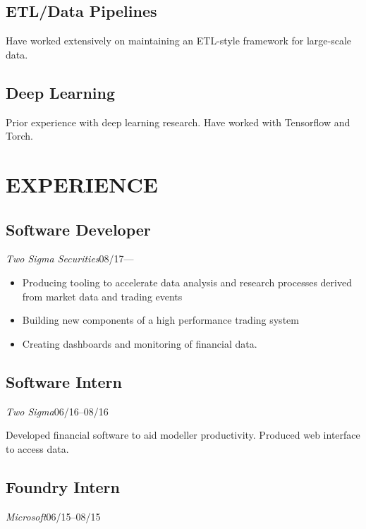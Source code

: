 \documentclass[11pt]{article}
\begin{document}
\begin{minipage}[t]{0.40\textwidth}
  \medskip
  \subsection*{ETL/Data Pipelines}
  Have worked extensively on maintaining an ETL-style framework for large-scale data.

  \medskip
  \subsection*{Deep Learning}
  Prior experience with deep learning research.
  Have worked with Tensorflow and Torch.


\end{minipage}\hspace{0.04\textwidth}
\begin{minipage}[t]{0.55\textwidth}
  \section*{\LARGE EXPERIENCE}

  \subsection*{Software Developer}
  \emph{Two Sigma Securities}\hfill08/17---
  \smallskip

  \begin{itemize}
  \item Producing tooling to accelerate data analysis and research processes derived from market data and trading events
  \item Building new components of a high performance trading system
  \item Creating dashboards and monitoring of financial data.
  \end{itemize}

  \medskip
  \subsection*{Software Intern}
  \emph{Two Sigma}\hfill 06/16--08/16
  \smallskip

  Developed financial software to aid modeller productivity.
  Produced web interface to access data.

  \medskip
  \subsection*{Foundry Intern}
  \emph{Microsoft}\hfill 06/15--08/15
  \smallskip


\end{minipage}
\end{document}

